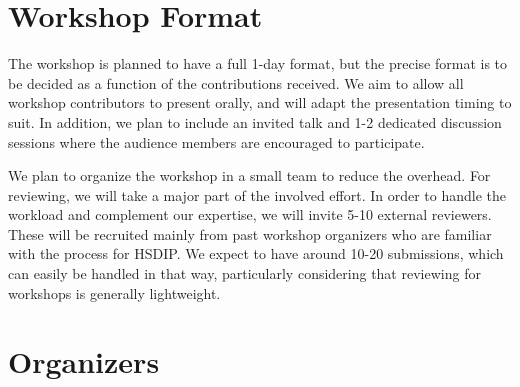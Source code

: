 \documentclass[10pt]{article}
\begin{document}
\section*{Workshop Format}

The workshop is planned to have a full 1-day format, but the precise format is
to be decided as a function of the contributions received.  We aim to allow all
workshop contributors to present orally, and will adapt the presentation timing
to suit. In addition, we plan to include an invited talk and 1-2 dedicated
discussion sessions where the audience members are encouraged to participate.

We plan to organize the workshop in a small team to reduce the overhead. For
reviewing, we will take a major part of the involved effort. In order to handle
the workload and complement our expertise, we will invite 5-10 external
reviewers. These will be recruited mainly from past workshop organizers who are
familiar with the process for HSDIP. We expect to have around 10-20 submissions, which can
easily be handled in that way, particularly considering that reviewing for
workshops is generally lightweight.


\section*{Organizers}
\end{document}
